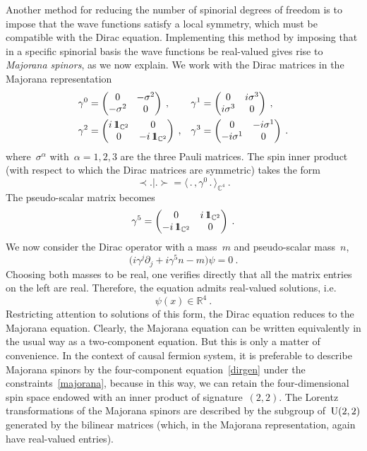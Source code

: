 \documentclass[reqno,11pt]{amsart}
\numberwithin{equation}{section}
\newcommand{\beq}{\begin{equation}}
\newcommand{\eeq}{\end{equation}}
\newcommand{\la}{\langle}
\newcommand{\ra}{\rangle}
\newcommand{\Sl}{\mathopen{\prec}}
\newcommand{\Sr}{\mathclose{\succ}}
\newcommand{\C}{\mathbb{C}}
\newcommand{\R}{\mathbb{R}}
\newcommand{\1}{\mbox{\rm 1 \hspace{-1.05 em} 1}}
\newcommand{\U}{{\rm{U}}}
\begin{document}
Another method for reducing the number of spinorial degrees of freedom is to impose that
the wave functions satisfy a local symmetry, which must be compatible with the Dirac equation.
Implementing this method by imposing that in a specific spinorial basis the
wave functions be real-valued gives rise to {\em{Majorana spinors}}, as we now explain.
We work with the Dirac matrices in the Majorana representation
\begin{align*}
\gamma^0 &= \begin{pmatrix} 0 & -\sigma^2 \\ -\sigma^2 & 0 \end{pmatrix} \:,&
\gamma^1 &= \begin{pmatrix} 0 & i \sigma^3 \\ i \sigma^3 & 0 \end{pmatrix} \:,\\
\gamma^2 &= \begin{pmatrix} i\,\1_{\C^2} & 0 \\ 0 & -i\,\1_{\C^2} \end{pmatrix} \:,&
\gamma^3 &= \begin{pmatrix} 0 & -i \sigma^1 \\ -i \sigma^1 & 0 \end{pmatrix} \:.
\end{align*}
where~$\sigma^\alpha$ with~$\alpha=1,2,3$ are the three Pauli matrices.
The spin inner product (with respect to which the Dirac matrices are symmetric) takes the form
\[ \Sl .|. \Sr = \la \,.\,, \gamma^0 \,.\, \ra_{\C^4} \:. \]
The pseudo-scalar matrix becomes
\[ \gamma^5 = \begin{pmatrix} 0 & i\,\1_{\C^2} \\ -i\,\1_{\C^2} & 0 \end{pmatrix} \:. \]
We now consider the Dirac operator with a mass~$m$ and pseudo-scalar mass~$n$,
\beq \label{dirgen}
\big( i \gamma^j \partial_j + i \gamma^5 n - m \big) \psi = 0 \:.
\eeq
Choosing both masses to be real, one verifies directly that all the matrix entries on the left are real.
Therefore, the equation admits real-valued solutions, i.e.\
\beq \label{majorana}
\psi(x) \in \R^4 \:.
\eeq
Restricting attention to solutions of this form, the Dirac equation reduces to the Majorana equation.
Clearly, the Majorana equation can be written equivalently in the usual way as a two-component equation.
But this is only a matter of convenience. In the context of causal fermion system, it is preferable
to describe Majorana spinors by the four-component equation~\eqref{dirgen} under the constraints~\eqref{majorana},
because in this way, we can retain the four-dimensional spin space endowed with an inner product
of signature~$(2,2)$. The Lorentz transformations of the Majorana spinors are described by
the subgroup of~$\U(2,2)$ generated by the bilinear matrices (which, in the Majorana representation,
again have real-valued entries).
\end{document}
